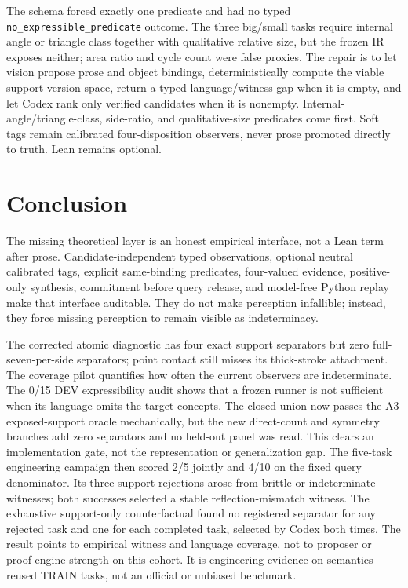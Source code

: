 \documentclass[11pt]{article}
\begin{document}
The schema forced exactly one predicate and had no typed
\texttt{no\_expressible\_predicate} outcome.  The three big/small tasks require
internal angle or triangle class together with qualitative relative size, but
the frozen IR exposes neither; area ratio and cycle count were false proxies.
The repair is to let vision propose prose and object bindings, deterministically
compute the viable support version space, return a typed language/witness gap
when it is empty, and let Codex rank only verified candidates when it is
nonempty.  Internal-angle/triangle-class, side-ratio, and qualitative-size
predicates come first.  Soft tags remain calibrated four-disposition
observers, never prose promoted directly to truth.  Lean remains optional.

\section{Conclusion}

The missing theoretical layer is an honest empirical interface, not a Lean
term after prose.  Candidate-independent typed observations, optional neutral
calibrated tags, explicit same-binding predicates, four-valued evidence,
positive-only synthesis, commitment before query release, and model-free
Python replay make that interface auditable.  They do not make perception
infallible; instead, they force missing perception to remain visible as
indeterminacy.

The corrected atomic diagnostic has four exact support separators but zero
full-seven-per-side separators; point contact still misses its thick-stroke
attachment.  The coverage pilot quantifies how often the current observers are
indeterminate.  The 0/15 DEV expressibility audit shows that a frozen runner is
not sufficient when its language omits the target concepts.  The closed union
now passes the A3 exposed-support oracle mechanically, but the new direct-count
and symmetry branches add zero separators and no held-out panel was read.  This
clears an implementation gate, not the representation or generalization gap.
The five-task engineering campaign then scored 2/5 jointly and 4/10 on the
fixed query denominator.  Its three support rejections arose from brittle or
indeterminate witnesses; both successes selected a stable reflection-mismatch
witness.  The exhaustive support-only counterfactual found no registered
separator for any rejected task and one for each completed task, selected by
Codex both times.  The result points to empirical witness and language
coverage, not to proposer or proof-engine strength on this cohort.  It is
engineering evidence on semantics-reused TRAIN tasks, not an official or
unbiased benchmark.
\end{document}
